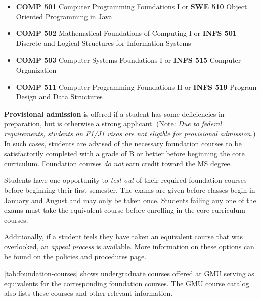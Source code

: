 \documentclass[oneside,11pt]{memoir}
\begin{document}
\begin{itemize}
\item \textbf{COMP 501} Computer Programming Foundations I or \textbf{SWE 510} Object Oriented Programming in Java
\item \textbf{COMP 502} Mathematical Foundations of Computing I or \textbf{INFS 501} Discrete and Logical Structures for Information Systems
\item \textbf{COMP 503} Computer Systems Foundations I or \textbf{INFS 515} Computer Organization
\item \textbf{COMP 511} Computer Programming Foundations II or \textbf{INFS 519} Program Design and Data Structures
\end{itemize}

\textbf{Provisional admission} is offered if a student has some deficiencies in preparation, but is otherwise a strong applicant. (Note: \emph{Due to federal requirements, students on F1/J1 visas are not eligible for provisional admission.}) In such cases, students are advised of the necessary foundation courses to be satisfactorily completed with a grade of B or better before beginning the core curriculum. Foundation courses \emph{do not} earn credit toward the MS degree. 

Students have one opportunity to \emph{test out} of their required foundation courses before beginning their first semester. 
The exams are given before classes begin in January and August and may only be taken once. Students failing any one of the exams must take the equivalent course before enrolling in the core curriculum courses.

Additionally, if a student feels they have taken an equivalent course that was overlooked, an \emph{appeal process} is available. More information on these options can be found on the \href{https://cs.gmu.edu/current-students/ms-students/foundation-courses/policies-and-procedures/}{policies and procedures page}.

\autoref{tab:foundation-courses} shows undergraduate courses offered at GMU serving as equivalents for the corresponding foundation courses. The \href{https://catalog.gmu.edu/colleges-schools/engineering-computing/school-computing/computer-science/software-engineering-ms/#admissionspoliciestext}{GMU course catalog} also lists these courses and other relevant information. 
\end{document}
